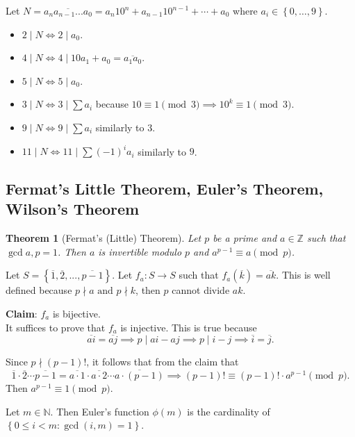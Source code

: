 \documentclass[11pt]{article}
\newtheorem{thm}{Theorem}[section]
\theoremstyle{definition}
\newcommand{\The}[2]{\begin{#1}#2\end{#1}}
\newcommand{\set}[1]{\left\{ #1 \right\}}
\newcommand{\rng}[2]{#1,\dots,#2}
\newcommand{\et}[0]{\text{ and }}
\newcommand{\ZZ}{\mathbb{Z}}
\newcommand{\NN}{\mathbb{N}}
\begin{document}
Let $N=\overline{a_na_{n-1}...a_0} = a_n10^n + a_{n-1}10^{n-1} + \cdots + a_0$ where $a_i \in\set{\rng{0}{9}}$. 
\begin{itemize} 
	\item $2\mid N \iff 2\mid a_0$. 
	\item $4\mid N \iff 4\mid 10a_1+a_0 = \overline{a_1a_0}$.
	\item $5\mid N \iff 5\mid a_0$. 
	\item $3\mid N \iff 3\mid \sum{a_i}$ because $10\equiv 1\pmod{3} \implies 10^k\equiv 1\pmod{3}$.
	\item $9\mid N \iff 9\mid \sum{a_i}$ similarly to $3$.
	\item $11\mid N \iff 11\mid \sum{(-1)^ia_i}$ similarly to $9$.
\end{itemize}

\subsection{Fermat's Little Theorem, Euler's Theorem, Wilson's Theorem}

\begin{thm}[Fermat's (Little) Theorem]
Let $p$ be a prime and $a\in\ZZ$ such that $\gcd{a,p}=1$. Then $a$ is invertible modulo $p$ and $a^{p-1}\equiv a\pmod{p}$. 
\end{thm}
\proof Let $S = \set{\overline{1}, \overline{2}, ..., \overline{p-1}}$. Let $f_a:S\to S$ such that $f_a(\overline{k}) = \overline{ak}$. This is well defined because $p\nmid a \et p\nmid k$, then $p$ cannot divide $ak$. 

\noindent\textbf{Claim}: $f_a$ is bijective. \\
It suffices to prove that $f_a$ is injective. This is true because 
$$\overline{ai} = \overline{aj} \implies p\mid{ai-aj} \implies p\mid{i-j} \implies \overline{i} = \overline{j}. $$ 

Since $p\nmid(p-1)!$, it follows that from the claim that 
$$\overline{1}\cdot\overline{2}\cdots\overline{p-1} = \overline{a\cdot1}\cdot\overline{a\cdot2}\cdots\overline{a\cdot(p-1)} \implies (p-1)! \equiv (p-1)!\cdot a^{p-1} \pmod{p}.$$
Then $a^{p-1}\equiv 1\pmod{p}$.
\qedhere

\The{defn} {
	Let $m\in\NN$. Then Euler's function $\phi(m)$ is the cardinality of \\$\set{0\le i<m: \gcd(i,m)=1}$.
}
\end{document}
